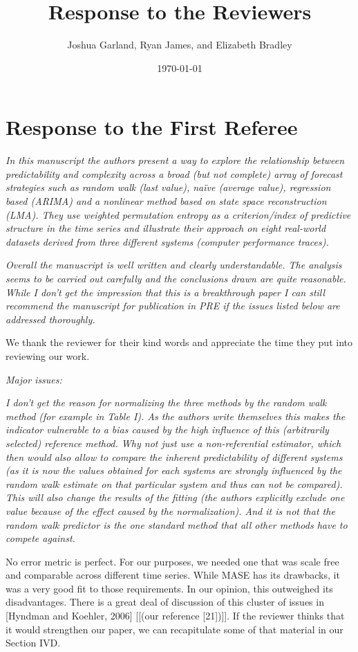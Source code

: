 \documentclass[12pt]{article}
\title{Response to the Reviewers}
\author{Joshua Garland, Ryan James, and Elizabeth Bradley}
\date{\today}
\newcommand{\alert}[1]{{\color{red}#1}}
\begin{document}
\maketitle

\section*{Response to the First Referee}

\emph{In this manuscript the authors present a way to explore the
  relationship between predictability and complexity across a broad
  (but not complete) array of forecast strategies such as random walk
  (last value), na\"ive (average value), regression based (ARIMA) and
  a nonlinear method based on state space reconstruction (LMA). They
  use weighted permutation entropy as a criterion/index of predictive
  structure in the time series and illustrate their approach on eight
  real-world datasets derived from three different systems (computer
  performance traces).}

\emph{Overall the manuscript is well written and clearly
  understandable. The analysis seems to be carried out carefully and
  the conclusions drawn are quite reasonable. While I don't get the
  impression that this is a breakthrough paper I can still recommend
  the manuscript for publication in PRE if the issues listed below are
  addressed thoroughly.}

We thank the reviewer for their kind words and appreciate the time
they put into reviewing our work.

\noindent\emph{Major issues:}

\emph{I don't get the reason for normalizing the three methods by the
  random walk method (for example in Table I). As the authors write
  themselves this makes the indicator vulnerable to a bias caused by
  the high influence of this (arbitrarily selected) reference
  method. Why not just use a non-referential estimator, which then
  would also allow to compare the inherent predictability of different
  systems (as it is now the values obtained for each systems are
  strongly influenced by the random walk estimate on that particular
  system and thus can not be compared). This will also change the
  results of the fitting (the authors explicitly exclude one value
  because of the effect caused by the normalization). And it is not
  that the random walk predictor is the one standard method that all
  other methods have to compete against.}

No error metric is perfect.  For our purposes, we needed one that was
scale free and comparable across different time series.  While MASE
has its drawbacks, it was a very good fit to those requirements.  In
our opinion, this outweighed its disadvantages.  There is a great deal
of discussion of this cluster of issues in [Hyndman and Koehler, 2006]
\alert{[[(our reference [21])]]}.  If the reviewer thinks that it
would strengthen our paper, we can recapitulate some of that material
in our Section IVD.
\end{document}
